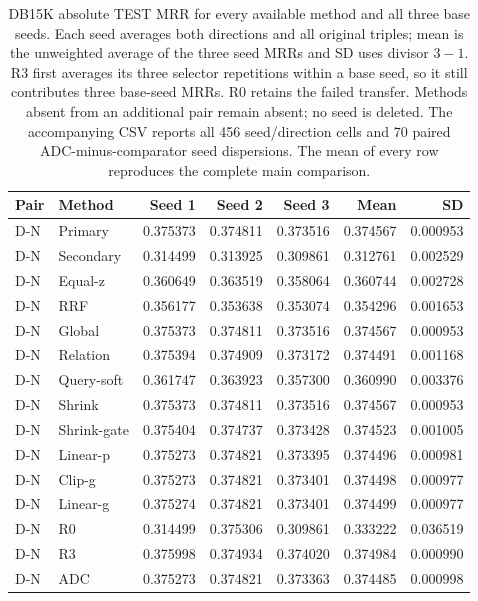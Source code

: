 \begin{table}[htbp]
\centering\footnotesize\setlength{\tabcolsep}{3pt}
\caption{DB15K absolute TEST MRR for every available method and all three base seeds. Each seed averages both directions and all original triples; mean is the unweighted average of the three seed MRRs and SD uses divisor $3-1$. R3 first averages its three selector repetitions within a base seed, so it still contributes three base-seed MRRs. R0 retains the failed transfer. Methods absent from an additional pair remain absent; no seed is deleted. The accompanying CSV reports all 456 seed/direction cells and 70 paired ADC-minus-comparator seed dispersions. The mean of every row reproduces the complete main comparison.}
\label{tab:selection-seeds-db15k}
\begin{tabular}{llrrrrr}
\toprule
Pair & Method & Seed 1 & Seed 2 & Seed 3 & Mean & SD\\
\midrule
D-N & Primary & 0.375373 & 0.374811 & 0.373516 & 0.374567 & 0.000953\\
D-N & Secondary & 0.314499 & 0.313925 & 0.309861 & 0.312761 & 0.002529\\
D-N & Equal-z & 0.360649 & 0.363519 & 0.358064 & 0.360744 & 0.002728\\
D-N & RRF & 0.356177 & 0.353638 & 0.353074 & 0.354296 & 0.001653\\
D-N & Global & 0.375373 & 0.374811 & 0.373516 & 0.374567 & 0.000953\\
D-N & Relation & 0.375394 & 0.374909 & 0.373172 & 0.374491 & 0.001168\\
D-N & Query-soft & 0.361747 & 0.363923 & 0.357300 & 0.360990 & 0.003376\\
D-N & Shrink & 0.375373 & 0.374811 & 0.373516 & 0.374567 & 0.000953\\
D-N & Shrink-gate & 0.375404 & 0.374737 & 0.373428 & 0.374523 & 0.001005\\
D-N & Linear-p & 0.375273 & 0.374821 & 0.373395 & 0.374496 & 0.000981\\
D-N & Clip-g & 0.375273 & 0.374821 & 0.373401 & 0.374498 & 0.000977\\
D-N & Linear-g & 0.375274 & 0.374821 & 0.373401 & 0.374499 & 0.000977\\
D-N & R0 & 0.314499 & 0.375306 & 0.309861 & 0.333222 & 0.036519\\
D-N & R3 & 0.375998 & 0.374934 & 0.374020 & 0.374984 & 0.000990\\
D-N & ADC & 0.375273 & 0.374821 & 0.373363 & 0.374485 & 0.000998\\

\end{tabular}
\end{table}
